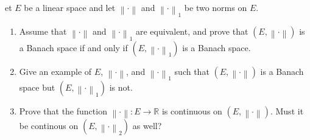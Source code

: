\documentclass[12pt]{article}
\newcommand{\R}{\mathbb{R}}
\theoremstyle{definition}
\newenvironment{problem}[2][Problem]{\begin{trivlist}
\item[\hskip \labelsep {\bfseries #1}\hskip \labelsep {\bfseries #2.}]}{\end{trivlist}}
\begin{document}
\begin{problem}
	Let $E$ be a linear space and let $\left \lVert {  \cdot } \right \lVert $ and $\left \lVert { \cdot } \right \lVert _1$ be two norms on $E$.
	\begin{enumerate}[label=(\roman*)]
		\item Assume that $\left \lVert { \cdot } \right \lVert $ and $\left \lVert { \cdot } \right \lVert _1$ are equivalent, and prove that $(E, \left \lVert { \cdot } \right \lVert )$ is a Banach space if and only if $(E, \left \lVert { \cdot } \right \lVert _1)$ is a Banach space.
		\item Give an example of $E$, $\left \lVert { \cdot } \right \lVert$, and $\left \lVert {  \cdot } \right \lVert _1$ such that $(E, \left \lVert {  \cdot } \right \lVert )$ is a Banach space but $(E, \left \lVert {  \cdot } \right \lVert _1)$ is not.
		\item Prove that the function $\left \lVert {  \cdot } \right \lVert  : E \to \R$ is continuous on $(E, \left \lVert { \cdot } \right \lVert )$. Must it be continous on $(E, \left \lVert { \cdot } \right \lVert _2)$ as well?

	\end{enumerate}

\end{problem}
\end{document}
